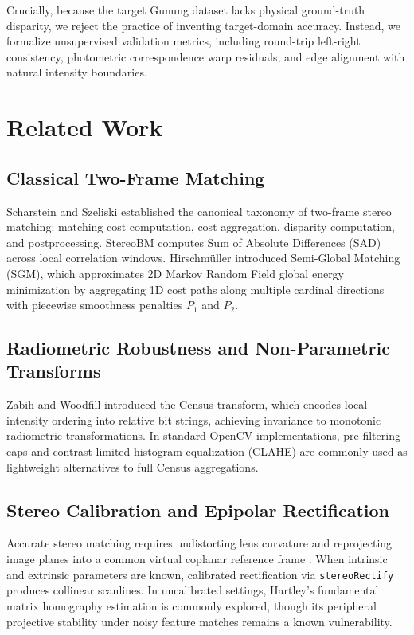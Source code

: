 \documentclass[journal]{IEEEtran}
\begin{document}
Crucially, because the target Gunung dataset lacks physical ground-truth disparity, we reject the practice of inventing target-domain accuracy. Instead, we formalize unsupervised validation metrics, including round-trip left-right consistency, photometric correspondence warp residuals, and edge alignment with natural intensity boundaries.

\section{Related Work}
\subsection{Classical Two-Frame Matching}
Scharstein and Szeliski \cite{scharstein2002taxonomy} established the canonical taxonomy of two-frame stereo matching: matching cost computation, cost aggregation, disparity computation, and postprocessing. StereoBM computes Sum of Absolute Differences (SAD) across local correlation windows. Hirschm{\"u}ller \cite{hirschmuller2008stereo} introduced Semi-Global Matching (SGM), which approximates 2D Markov Random Field global energy minimization by aggregating 1D cost paths along multiple cardinal directions with piecewise smoothness penalties $P_1$ and $P_2$.

\subsection{Radiometric Robustness and Non-Parametric Transforms}
Zabih and Woodfill \cite{zabih1994non} introduced the Census transform, which encodes local intensity ordering into relative bit strings, achieving invariance to monotonic radiometric transformations. In standard OpenCV implementations, pre-filtering caps and contrast-limited histogram equalization (CLAHE) are commonly used as lightweight alternatives to full Census aggregations.

\subsection{Stereo Calibration and Epipolar Rectification}
Accurate stereo matching requires undistorting lens curvature and reprojecting image planes into a common virtual coplanar reference frame \cite{hartley2004multiple}. When intrinsic and extrinsic parameters are known, calibrated rectification via \texttt{stereoRectify} produces collinear scanlines. In uncalibrated settings, Hartley's fundamental matrix homography estimation is commonly explored, though its peripheral projective stability under noisy feature matches remains a known vulnerability.
\end{document}
